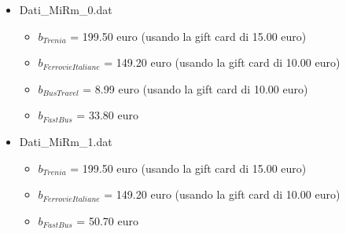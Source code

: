 \documentclass[main.tex]{subfiles}
\begin{document}
\begin{itemize}
\begin{itemize}
        \item Dati\_MiRm\_0.dat
        \begin{itemize}
            \item $b_{Trenia}$ = 199.50 euro (usando la gift card di 15.00 euro)
            \item $b_{FerrovieItaliane}$ = 149.20 euro (usando la gift card di 10.00 euro)
            \item $b_{BusTravel}$ =  8.99 euro (usando la gift card di 10.00 euro)
            \item $b_{FastBus}$ = 33.80 euro
        \end{itemize}
        \item Dati\_MiRm\_1.dat
        \begin{itemize}
            \item $b_{Trenia}$ = 199.50 euro (usando la gift card di 15.00 euro)
            \item $b_{FerrovieItaliane}$ = 149.20 euro (usando la gift card di 10.00 euro)
            \item $b_{FastBus}$ = 50.70 euro
        \end{itemize}
    \end{itemize}
\end{itemize}
\end{document}

